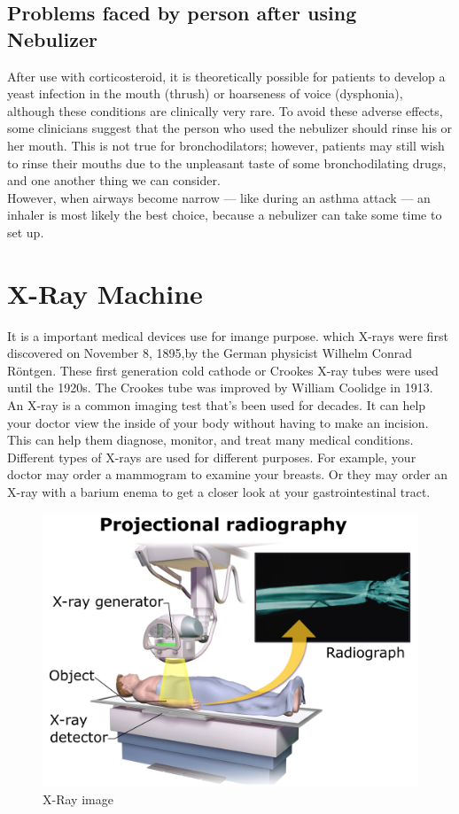 \documentclass[12pt]{article}
\begin{document}
\subsection{Problems faced by person after using Nebulizer}

After use with corticosteroid, it is theoretically possible for patients to develop a yeast infection in the mouth (thrush) or hoarseness of voice (dysphonia), although these conditions are clinically very rare. To avoid these adverse effects, some clinicians suggest that the person who used the nebulizer should rinse his or her mouth. This is not true for bronchodilators; however, patients may still wish to rinse their mouths due to the unpleasant taste of some bronchodilating drugs, and one another thing we can consider.\\
 However, when airways become narrow — like during an asthma attack — an inhaler is most likely the best choice, because a nebulizer can take some time to set up.\\
\clearpage


\section{X-Ray Machine}


  It is a important medical devices use for imange purpose. which X-rays were first discovered on November 8, 1895,by the German physicist Wilhelm Conrad Röntgen. These first generation cold cathode or Crookes X-ray tubes were used until the 1920s. The Crookes tube was improved by William Coolidge in 1913.\\
  An X-ray is a common imaging test that’s been used for decades. It can help your doctor view the inside of your body without having to make an incision. This can help them diagnose, monitor, and treat many medical conditions.
Different types of X-rays are used for different purposes. For example, your doctor may order a mammogram to examine your breasts. Or they may order an X-ray with a barium enema to get a closer look at your gastrointestinal tract.\\
\begin{figure}[h]
\centering
\includegraphics[scale=0.1]{xray.jpg}
\caption{X-Ray image}
\end{figure}
\end{document}
